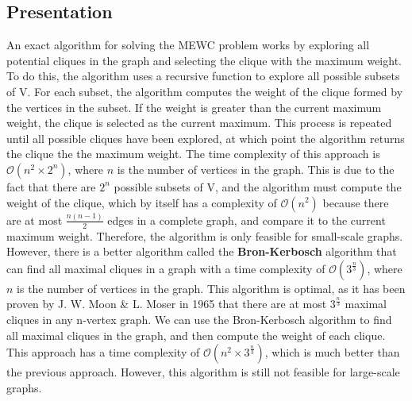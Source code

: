 \subsection{Presentation}

An exact algorithm for solving the MEWC problem works by exploring all potential
cliques in the graph and selecting the clique with the maximum weight. To do this,
the algorithm uses a recursive function to explore all possible subsets of V.
For each subset, the algorithm computes the weight of the clique formed by the
vertices in the subset. If the weight is greater than the current maximum weight,
the clique is selected as the current maximum. This process is repeated until all
possible cliques have been explored, at which point the algorithm returns the
clique the the maximum weight.
\newline \newline
The time complexity of this approach is $\mathcal{O}(n^2\times2^n)$, where $n$ 
is the number of vertices in the graph. This is due to the fact that there are 
$2^n$ possible subsets of V, and the algorithm must compute the weight of the clique, 
which by itself has a complexity of $\mathcal{O}(n^2)$ because there are at most
$\frac{n(n-1)}{2}$ edges in a complete graph, and compare it to the current 
maximum weight. Therefore, the algorithm is only feasible for small-scale graphs.
\newline \newline
However, there is a better algorithm called the \textbf{Bron-Kerbosch}
algorithm\cite{finding-all-cliques-of-an-undirected-graph} that can find all 
maximal cliques in a graph with a time complexity of $\mathcal{O}(3^{\frac{n}{3}})$, 
where $n$ is the number of vertices in the graph. 
This algorithm is optimal, as it has been proven by J. W. Moon \& L. Moser in 
1965\cite{on-cliques-in-graphs} that there are at most $3^{\frac{n}{3}}$ maximal 
cliques in any n-vertex graph.
\newline \newline
We can use the Bron-Kerbosch algorithm to find all maximal cliques in the graph,
and then compute the weight of each clique. This approach has a time complexity of
$\mathcal{O}(n^2\times3^{\frac{n}{3}})$, which is much better than the previous
approach. However, this algorithm is still not feasible for large-scale graphs.